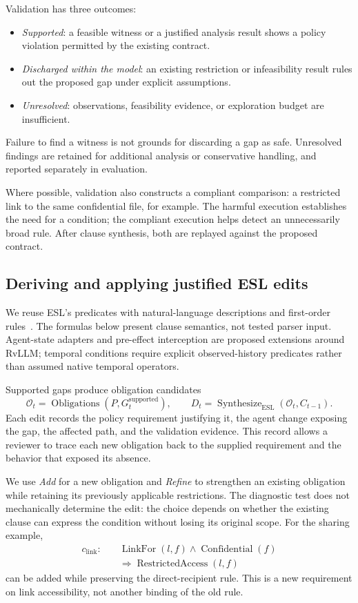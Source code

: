 Validation has three outcomes:
\begin{itemize}
\item \emph{Supported}: a feasible witness or a justified analysis result
shows a policy violation permitted by the existing contract.
\item \emph{Discharged within the model}: an existing restriction or
infeasibility result rules out the proposed gap under explicit assumptions.
\item \emph{Unresolved}: observations, feasibility evidence, or exploration
budget are insufficient.
\end{itemize}
Failure to find a witness is not grounds for discarding a gap as safe.
Unresolved findings are retained for additional analysis or conservative
handling, and reported separately in evaluation.

Where possible, validation also constructs a compliant comparison: a
restricted link to the same confidential file, for example. The harmful
execution establishes the need for a condition; the compliant execution helps
detect an unnecessarily broad rule. After clause synthesis, both are replayed
against the proposed contract.

\subsection{Deriving and applying justified ESL edits}

We reuse ESL's predicates with natural-language descriptions and first-order rules~\cite{zhang2025rvllm}. The formulas below present clause semantics, not tested parser input. Agent-state adapters and pre-effect interception are proposed extensions around RvLLM; temporal conditions require explicit observed-history predicates rather than assumed native temporal operators.

Supported gaps produce obligation candidates
\[
 \mathcal O_t=\operatorname{Obligations}(P,G_t^{\mathrm{supported}}),
 \qquad
 D_t=\operatorname{Synthesize}_{\mathrm{ESL}}
          (\mathcal O_t,C_{t-1}).
\]
Each edit records the policy requirement justifying it, the agent change
exposing the gap, the affected path, and the validation evidence.
This record allows a reviewer to trace each new obligation back to the supplied requirement and the behavior that exposed its absence.

We use \emph{Add} for a new obligation and \emph{Refine} to strengthen an
existing obligation while retaining its previously applicable restrictions.
The diagnostic test does not mechanically determine the edit: the choice
depends on whether the existing clause can express the condition without
losing its original scope. For the sharing example,
\[
 \begin{aligned}
 c_{\mathrm{link}}:\quad&
 \operatorname{LinkFor}(l,f)\land\operatorname{Confidential}(f)\\
 &\Rightarrow\operatorname{RestrictedAccess}(l,f)
 \end{aligned}
\]
can be added while preserving the direct-recipient rule. This is a new
requirement on link accessibility, not another binding of the old rule.

